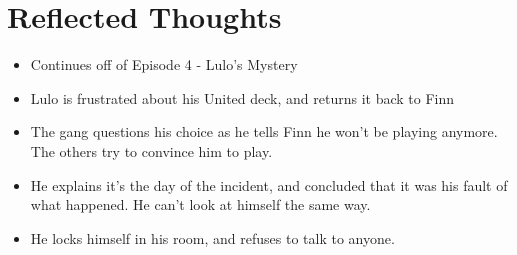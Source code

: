 \section{Reflected Thoughts}

\begin{itemize}
    \item Continues off of Episode 4 - Lulo’s Mystery
    \item Lulo is frustrated about his United deck, and returns it back to Finn
    \item The gang questions his choice as he tells Finn he won’t be playing anymore. The others try to convince him to play.
    \item He explains it’s the day of the incident, and concluded that it was his fault of what happened. He can’t look at himself the same way.
    \item He locks himself in his room, and refuses to talk to anyone.
\end{itemize}